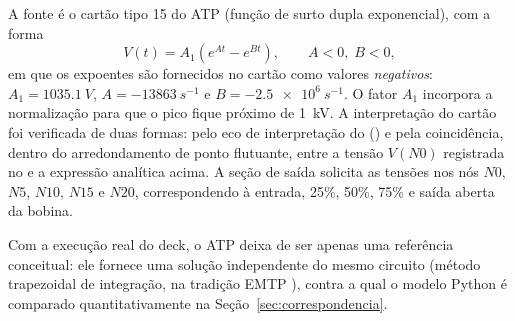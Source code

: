 A fonte é o cartão tipo 15 do ATP (função de surto dupla exponencial), com a forma
\begin{equation}
V(t) = A_1\left(e^{A t} - e^{B t}\right),
\qquad A < 0,\; B < 0,
\end{equation}
em que os expoentes são fornecidos no cartão como valores \emph{negativos}: \(A_1=\SI{1035.1}{V}\), \(A=\SI{-13863}{s^{-1}}\) e \(B=\SI{-2.5e6}{s^{-1}}\). O fator \(A_1\) incorpora a normalização para que o pico fique próximo de \SI{1}{kV}. A interpretação do cartão foi verificada de duas formas: pelo eco de interpretação do  () e pela coincidência, dentro do arredondamento de ponto flutuante, entre a tensão \(V(N0)\) registrada no  e a expressão analítica acima. A seção de saída solicita as tensões nos nós \(N0\), \(N5\), \(N10\), \(N15\) e \(N20\), correspondendo à entrada, 25\%, 50\%, 75\% e saída aberta da bobina.

Com a execução real do deck, o ATP deixa de ser apenas uma referência conceitual: ele fornece uma solução independente do mesmo circuito (método trapezoidal de integração, na tradição EMTP \cite{dommel1969}), contra a qual o modelo Python é comparado quantitativamente na Seção~\ref{sec:correspondencia}.
